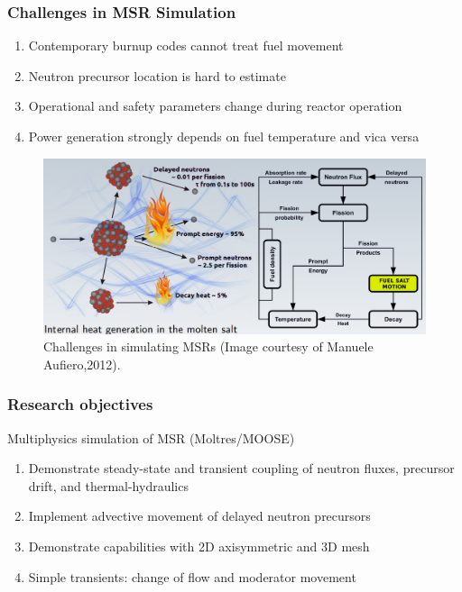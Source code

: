 \begin{frame}
  \frametitle{Challenges in \gls{MSR} Simulation}
                  \vspace*{-0.05in}
               \begin{enumerate}
                \item Contemporary burnup codes cannot treat fuel movement
                \item Neutron precursor location is hard to estimate
                \item Operational and safety parameters change during reactor operation
                \item Power generation strongly depends on fuel temperature and vica versa
               \end{enumerate}

           \begin{figure}[t]
                \vspace*{-0.05in}
			\hspace*{-0.2in}
                \includegraphics[height=0.47\textwidth]{./images/coupled_physics.png}
		\vspace*{-0.05in}
		\caption{Challenges in simulating \glspl{MSR} (Image courtesy of Manuele Aufiero,2012).}
     	 \end{figure}               
\end{frame}

\begin{frame}
  \frametitle{Research objectives}
                  \vspace*{-0.1in}

              \begin{block}{Multiphysics simulation of \gls{MSR} (Moltres/MOOSE)\cite{lindsay_introduction_2018}}
               \begin{enumerate}
                \item Demonstrate steady-state and transient coupling of neutron fluxes, precursor drift, and thermal-hydraulics
                \item Implement advective movement of delayed neutron precursors
                \item Demonstrate capabilities with 2D axisymmetric and 3D mesh
                \item Simple transients: change of flow and moderator movement
               \end{enumerate}
               \end{block}


              
\end{frame}
